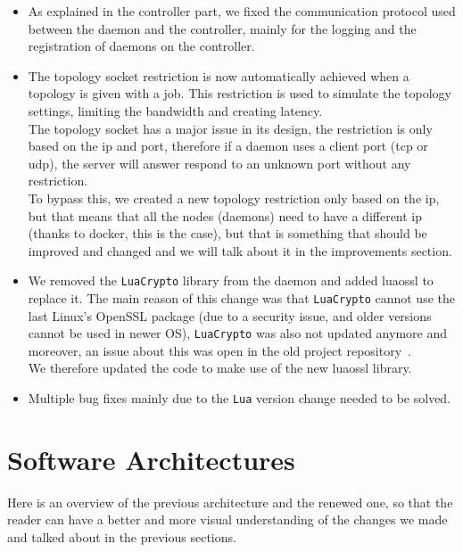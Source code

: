 \documentclass{eplmastersthesis}
\begin{document}
        \begin{itemize}
          \item As explained in the controller part, we fixed the communication
          protocol used between the daemon and the controller, mainly for
          the logging and the registration of daemons on the controller.
          \item The topology socket restriction %
          is now automatically achieved
          when a topology is given with a job. This restriction is used to
          simulate the topology settings, limiting the bandwidth and creating
          latency.\\
          The topology socket has a major issue in its design, the restriction
          is only based on the ip and port, therefore if a daemon uses a client
          port (tcp or udp), the server will answer respond to an unknown port
          without any restriction.\\
          To bypass this, we created a new topology restriction only based on
          the ip, but that means that all the nodes (daemons) need to have a
          different ip (thanks to docker, this is the case), but that is
          something that should be improved and changed and we will talk about
          it in the improvements section.
          \item We removed the \texttt{LuaCrypto} library from the daemon and added
          luaossl to replace it. The main reason of this change was that
          \texttt{LuaCrypto} cannot use the last Linux's OpenSSL package (due to a
          security issue, and older versions cannot be used in newer OS),
          \texttt{LuaCrypto} was also not updated anymore and moreover, an issue about
          this was open in the old project repository~\cite{sslLib}.\\
          We therefore updated the code to make use of the new luaossl library.
          \item Multiple bug fixes mainly due to the \texttt{Lua} version change needed
          to be solved.
        \end{itemize}

    \section{Software Architectures}

      Here is an overview of the previous architecture and the renewed one,
      so that the reader can have a better and more visual understanding
      of the changes we made and talked about in the previous sections.
\end{document}
